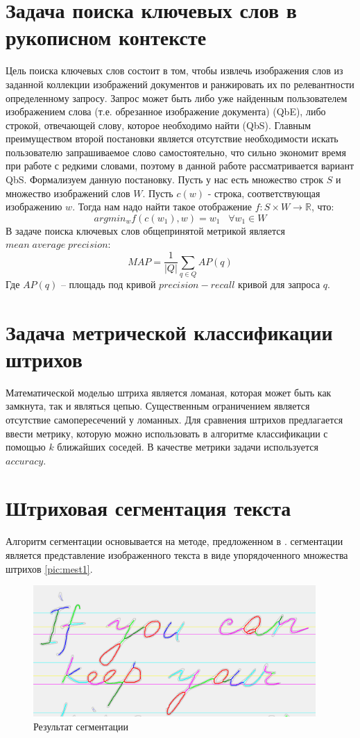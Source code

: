 \documentclass{article}
\begin{document}
\section{Задача поиска ключевых слов в рукописном контексте}
Цель поиска ключевых слов состоит в том, чтобы извлечь изображения слов из заданной коллекции изображений документов и ранжировать их по релевантности определенному запросу. Запрос может быть либо уже найденным пользователем изображением слова (т.е. обрезанное изображение документа) (QbE), либо строкой, отвечающей слову, которое необходимо найти (QbS). Главным преимуществом второй постановки является отсутствие необходимости искать пользователю запрашиваемое слово самостоятельно, что сильно экономит время при работе с редкими словами, поэтому в данной работе рассматривается вариант QbS. Формализуем данную постановку. Пусть у нас есть множество строк $S$ и множество изображений слов $W$. Пусть $c(w)$ - строка, соответствующая изображению $w$. Тогда нам надо найти такое отображение $f: S \times W \rightarrow \mathbb{R}$, что:
$$argmin_w f(c(w_1), w) = w_1\;\;\;\forall w_1 \in W$$
В задаче поиска ключевых слов общепринятой метрикой является  $mean\; average\; precision$:
$$MAP = \frac{1}{|Q|}\sum_{q \in Q}AP(q)$$
Где $AP(q)$ -- площадь под кривой $precision-recall$ кривой для запроса $q$.\\
\section{Задача метрической классификации штрихов}
Математической моделью штриха является ломаная, которая может быть как замкнута, так и являться цепью. Существенным ограничением является отсутствие самопересечений у ломанных. Для сравнения штрихов предлагается ввести метрику, которую можно использовать в алгоритме классификации с помощью $k$ ближайших соседей. В качестве метрики задачи используется $accuracy$.
\section{Штриховая сегментация текста}
    Алгоритм сегментации основывается на методе, предложенном в \citep{mestetskiy2009}.
     сегментации является представление изображенного текста в виде упорядоченного множества штрихов \autoref{pic:mest1}. 

    \begin{figure}[H]
    	\includegraphics[scale=0.9, height = 5cm]{img/mest9.png}
    	\centering
    	\caption{Результат сегментации}
    	\label{pic:mest1}
    \end{figure}
\end{document}

